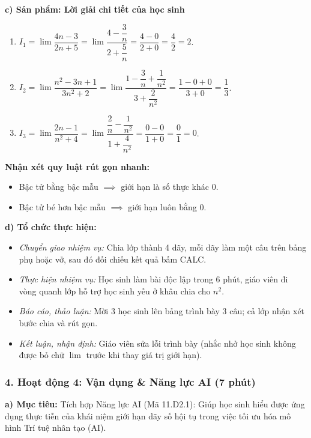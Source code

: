 \documentclass[12pt, a4paper]{article}
\begin{document}
\noindent \textbf{c) Sản phẩm: Lời giải chi tiết của học sinh}
\begin{enumerate}[leftmargin=0.6cm]
    \item $I_1 = \lim \dfrac{4n - 3}{2n + 5} = \lim \dfrac{4 - \dfrac{3}{n}}{2 + \dfrac{5}{n}} = \dfrac{4 - 0}{2 + 0} = \dfrac{4}{2} = 2$.
    \item $I_2 = \lim \dfrac{n^2 - 3n + 1}{3n^2 + 2} = \lim \dfrac{1 - \dfrac{3}{n} + \dfrac{1}{n^2}}{3 + \dfrac{2}{n^2}} = \dfrac{1 - 0 + 0}{3 + 0} = \dfrac{1}{3}$.
    \item $I_3 = \lim \dfrac{2n - 1}{n^2 + 4} = \lim \dfrac{\dfrac{2}{n} - \dfrac{1}{n^2}}{1 + \dfrac{4}{n^2}} = \dfrac{0 - 0}{1 + 0} = \dfrac{0}{1} = 0$.
\end{enumerate}
\textbf{Nhận xét quy luật rút gọn nhanh:}
\begin{itemize}[leftmargin=0.6cm]
    \item Bậc tử bằng bậc mẫu $\implies$ giới hạn là số thực khác 0.
    \item Bậc tử bé hơn bậc mẫu $\implies$ giới hạn luôn bằng 0.
\end{itemize}

\noindent \textbf{d) Tổ chức thực hiện:}
\begin{itemize}[leftmargin=0.8cm]
    \item \textit{Chuyển giao nhiệm vụ:} Chia lớp thành 4 dãy, mỗi dãy làm một câu trên bảng phụ hoặc vở, sau đó đối chiếu kết quả bấm CALC.
    \item \textit{Thực hiện nhiệm vụ:} Học sinh làm bài độc lập trong 6 phút, giáo viên đi vòng quanh lớp hỗ trợ học sinh yếu ở khâu chia cho $n^2$.
    \item \textit{Báo cáo, thảo luận:} Mời 3 học sinh lên bảng trình bày 3 câu; cả lớp nhận xét bước chia và rút gọn.
    \item \textit{Kết luận, nhận định:} Giáo viên sửa lỗi trình bày (nhắc nhở học sinh không được bỏ chữ $\lim$ trước khi thay giá trị giới hạn).
\end{itemize}

\subsubsection*{4. Hoạt động 4: Vận dụng \& Năng lực AI (7 phút)}

\noindent \textbf{a) Mục tiêu:}
Tích hợp Năng lực AI (Mã 11.D2.1): Giúp học sinh hiểu được ứng dụng thực tiễn của khái niệm giới hạn dãy số hội tụ trong việc tối ưu hóa mô hình Trí tuệ nhân tạo (AI).
\end{document}
